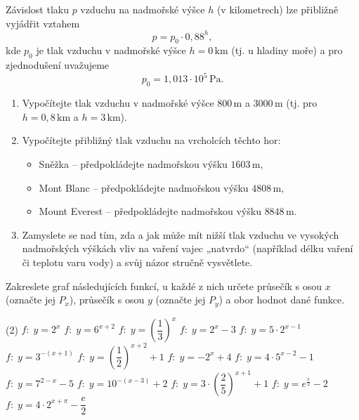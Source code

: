 \documentclass[12pt,a4paper]{article}
\begin{document}
\begin{exercise}

Závislost tlaku $p$ vzduchu na nadmořské výšce $h$ (v kilometrech) lze
přibližně vyjádřit vztahem
\[
    p = p_0 \cdot 0{,}88^{h},
\]
kde $p_0$ je tlak vzduchu v nadmořské výšce $h = 0\,\text{km}$ (tj. u hladiny moře)
a pro zjednodušení uvažujeme
\[
    p_0 = 1{,}013 \cdot 10^{5}\,\text{Pa}.
\]

\begin{enumerate}[label=\arabic*.]
    \item Vypočítejte tlak vzduchu v nadmořské výšce $800\,\text{m}$ a $3000\,\text{m}$
    (tj. pro $h = 0{,}8\,\text{km}$ a $h = 3\,\text{km}$).

    \item Vypočítejte přibližný tlak vzduchu na vrcholcích těchto hor:
    \begin{itemize}
        \item Sněžka – předpokládejte nadmořskou výšku $1603\,\text{m}$,
        \item Mont Blanc – předpokládejte nadmořskou výšku $4808\,\text{m}$,
        \item Mount Everest – předpokládejte nadmořskou výšku $8848\,\text{m}$.
    \end{itemize}

    \item Zamyslete se nad tím, zda a jak může mít nižší tlak vzduchu
    ve vysokých nadmořských výškách vliv na vaření vajec „natvrdo“
    (například délku vaření či teplotu varu vody) a svůj názor stručně vysvětlete.
\end{enumerate}

\end{exercise}


\begin{exercise}

Zakreslete graf následujících funkcí, u každé z nich určete průsečík s osou $x$
(označte jej $P_{x}$), průsečík s osou $y$ (označte jej $P_{y}$)
a obor hodnot dané funkce.

\begin{tasks}(2)
    \task $f:\; y = 2^{x}$
    \task $f:\; y = 6^{x+2}$
    \task $f:\; y = \left(\dfrac{1}{3}\right)^{x}$
    \task $f:\; y = 2^{x} - 3$
    \task $f:\; y = 5 \cdot 2^{x-1}$
    \task $f:\; y = 3^{-(x+1)}$
    \task $f:\; y = \left(\dfrac{1}{2}\right)^{x+2} + 1$
    \task $f:\; y = -2^{x} + 4$
    \task $f:\; y = 4 \cdot 5^{x-2} - 1$
    \task $f:\; y = 7^{2-x} - 5$
    \task $f:\; y = 10^{-(x-3)} + 2$
    \task $f:\; y = 3 \cdot \left(\dfrac{2}{5}\right)^{x+1} + 1$
    \task $f:\; y = e^{\frac{x}{2}} - 2$
    \task $f:\; y = 4 \cdot 2^{x+\pi} - \dfrac{e}{2}$
\end{tasks}
\end{exercise}
\end{document}
